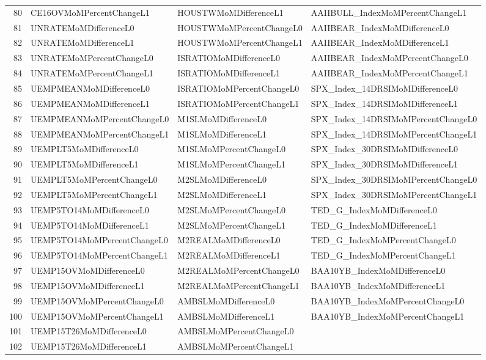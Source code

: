 \begin{longtable}{rlll}
  80 & CE16OVMoMPercentChangeL1 & HOUSTWMoMDifferenceL1 & AAIIBULL\_IndexMoMPercentChangeL1 \\ 
  81 & UNRATEMoMDifferenceL0 & HOUSTWMoMPercentChangeL0 & AAIIBEAR\_IndexMoMDifferenceL0 \\ 
  82 & UNRATEMoMDifferenceL1 & HOUSTWMoMPercentChangeL1 & AAIIBEAR\_IndexMoMDifferenceL1 \\ 
  83 & UNRATEMoMPercentChangeL0 & ISRATIOMoMDifferenceL0 & AAIIBEAR\_IndexMoMPercentChangeL0 \\ 
  84 & UNRATEMoMPercentChangeL1 & ISRATIOMoMDifferenceL1 & AAIIBEAR\_IndexMoMPercentChangeL1 \\ 
  85 & UEMPMEANMoMDifferenceL0 & ISRATIOMoMPercentChangeL0 & SPX\_Index\_14DRSIMoMDifferenceL0 \\ 
  86 & UEMPMEANMoMDifferenceL1 & ISRATIOMoMPercentChangeL1 & SPX\_Index\_14DRSIMoMDifferenceL1 \\ 
  87 & UEMPMEANMoMPercentChangeL0 & M1SLMoMDifferenceL0 & SPX\_Index\_14DRSIMoMPercentChangeL0 \\ 
  88 & UEMPMEANMoMPercentChangeL1 & M1SLMoMDifferenceL1 & SPX\_Index\_14DRSIMoMPercentChangeL1 \\ 
  89 & UEMPLT5MoMDifferenceL0 & M1SLMoMPercentChangeL0 & SPX\_Index\_30DRSIMoMDifferenceL0 \\ 
  90 & UEMPLT5MoMDifferenceL1 & M1SLMoMPercentChangeL1 & SPX\_Index\_30DRSIMoMDifferenceL1 \\ 
  91 & UEMPLT5MoMPercentChangeL0 & M2SLMoMDifferenceL0 & SPX\_Index\_30DRSIMoMPercentChangeL0 \\ 
  92 & UEMPLT5MoMPercentChangeL1 & M2SLMoMDifferenceL1 & SPX\_Index\_30DRSIMoMPercentChangeL1 \\ 
  93 & UEMP5TO14MoMDifferenceL0 & M2SLMoMPercentChangeL0 & TED\_G\_IndexMoMDifferenceL0 \\ 
  94 & UEMP5TO14MoMDifferenceL1 & M2SLMoMPercentChangeL1 & TED\_G\_IndexMoMDifferenceL1 \\ 
  95 & UEMP5TO14MoMPercentChangeL0 & M2REALMoMDifferenceL0 & TED\_G\_IndexMoMPercentChangeL0 \\ 
  96 & UEMP5TO14MoMPercentChangeL1 & M2REALMoMDifferenceL1 & TED\_G\_IndexMoMPercentChangeL1 \\ 
  97 & UEMP15OVMoMDifferenceL0 & M2REALMoMPercentChangeL0 & BAA10YB\_IndexMoMDifferenceL0 \\ 
  98 & UEMP15OVMoMDifferenceL1 & M2REALMoMPercentChangeL1 & BAA10YB\_IndexMoMDifferenceL1 \\ 
  99 & UEMP15OVMoMPercentChangeL0 & AMBSLMoMDifferenceL0 & BAA10YB\_IndexMoMPercentChangeL0 \\ 
  100 & UEMP15OVMoMPercentChangeL1 & AMBSLMoMDifferenceL1 & BAA10YB\_IndexMoMPercentChangeL1 \\ 
  101 & UEMP15T26MoMDifferenceL0 & AMBSLMoMPercentChangeL0 &  \\ 
  102 & UEMP15T26MoMDifferenceL1 & AMBSLMoMPercentChangeL1 &  \\ 
   \hline
\hline
\end{longtable}
